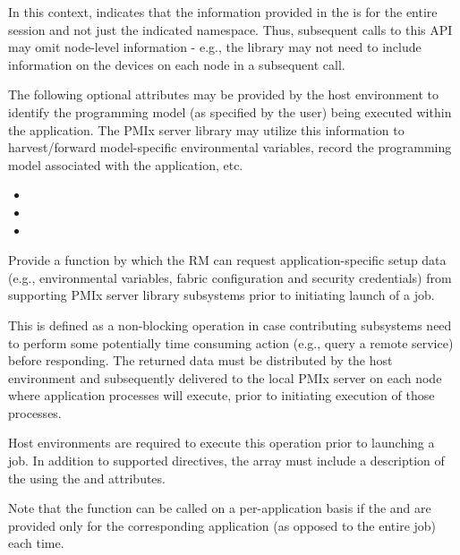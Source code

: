 In this context, indicates that the information provided in the  is for the entire session and not just the indicated namespace. Thus, subsequent calls to this \ac{API} may omit node-level information - e.g., the library may not need to include information on the devices on each node in a subsequent call.
\pasteAttributeItemEnd

The following optional attributes may be provided by the host environment to identify the programming model (as specified by the user) being executed within the application. The \ac{PMIx} server library may utilize this information to harvest/forward model-specific environmental variables, record the programming model associated with the application, etc.

\begin{itemize}
    \item {}
    \item {}
    \item {}
\end{itemize}

\optattrend

\descr

Provide a function by which the \ac{RM} can request application-specific setup data (e.g., environmental variables, fabric configuration and security credentials) from supporting \ac{PMIx} server library subsystems prior to initiating launch of a job.

This is defined as a non-blocking operation in case contributing subsystems need to perform some potentially time consuming action (e.g., query a remote service) before responding. The returned data must be distributed by the host environment and subsequently delivered to the local \ac{PMIx} server on each node where application processes will execute, prior to initiating execution of those processes.

\advicermstart
Host environments are required to execute this operation prior to launching a job. In addition to supported directives, the  array must include a description of the  using the  and  attributes.

Note that the function can be called on a per-application basis if the  and  are provided only for the corresponding application (as opposed to the entire job) each time.
\advicermend

